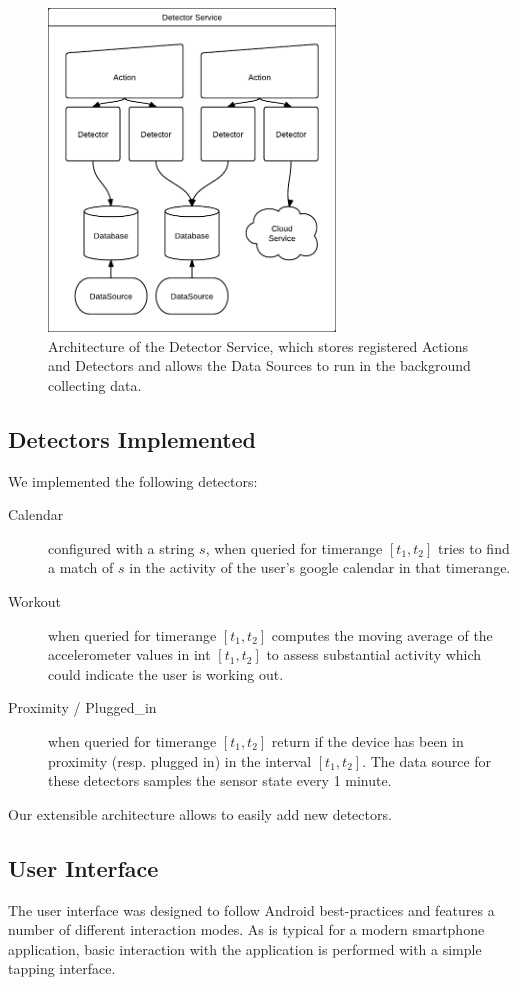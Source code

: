 \documentclass{acm_proc_article-sp}
\begin{document}
\begin{figure}
\begin{center}
\includegraphics[width=3in]{arch}
\caption{
Architecture of the Detector Service, which stores registered Actions and Detectors and allows the Data Sources to run in the background collecting data.
}
\label{figure:voice}
\end{center}
\end{figure}

\subsection{Detectors Implemented}

We implemented the following detectors:
\begin{description}
\item[Calendar] configured with a string $s$, when queried for timerange $[t_1,t_2]$ tries to find a match of $s$ in the activity of the user's google calendar in that timerange.
\item[Workout] when queried for timerange $[t_1,t_2]$ computes the moving average of the accelerometer values in int $[t_1,t_2]$ to assess substantial activity which could indicate the user is working out. 
\item[Proximity / Plugged\_in] when queried for timerange $[t_1,t_2]$ return if the device has been in proximity (resp. plugged in) in the interval $[t_1,t_2]$. The data source for these detectors samples the sensor state every 1 minute.
\end{description}

Our extensible architecture allows to easily add new detectors.


\subsection {User Interface}
The user interface was designed to follow Android best-practices and features a number of different interaction modes. As is typical for a modern smartphone application, basic interaction with the application is performed with a simple tapping interface. 
\end{document}
